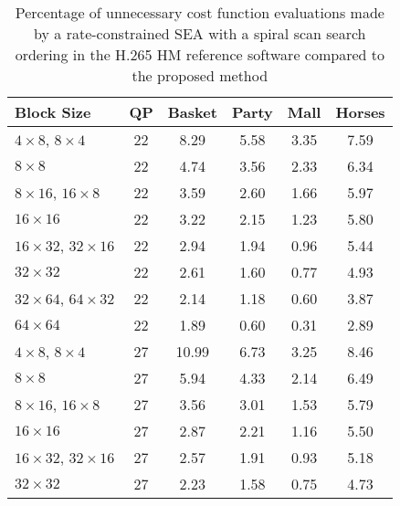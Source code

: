 \documentclass{article}
\begin{document}
\begin{table}[htb]                              
\centering
\small
  \caption{\small Percentage of unnecessary cost function evaluations made by a rate-constrained SEA with a spiral scan search ordering in the H.265 HM reference software compared to the proposed method}                      
\label{tab:SADGain}                       
\begin{tabular}{|l|c|c|c|c|c|}                 
\hline   
Block Size & QP & Basket & Party & Mall & Horses\\  
\hline                               
$4\times 8$, $8\times 4$ & 22 & 8.29 & 5.58 & 3.35 & 7.59 \\    
\hline                                         
$8\times 8$ & 22 & 4.74 & 3.56 & 2.33 & 6.34 \\        
\hline                                         
$8\times 16$, $16\times 8$ & 22 & 3.59 & 2.60 & 1.66 & 5.97 \\  
\hline                                         
$16\times 16$ & 22 & 3.22 & 2.15 & 1.23 & 5.80 \\      
\hline                                         
$16\times 32$, $32\times 16$ & 22 & 2.94 & 1.94 & 0.96 & 5.44 \\
\hline                                         
$32\times 32$ & 22 & 2.61 & 1.60 & 0.77 & 4.93 \\      
\hline                                         
$32\times 64$, $64\times 32$ & 22 & 2.14 & 1.18 & 0.60 & 3.87 \\
\hline                                         
$64\times 64$ & 22 & 1.89 & 0.60 & 0.31 & 2.89 \\      
\hline \hline                                         
$4\times 8$, $8\times 4$ & 27 & 10.99 & 6.73 & 3.25 & 8.46 \\   
\hline                                         
$8\times 8$ & 27 & 5.94 & 4.33 & 2.14 & 6.49 \\        
\hline                                         
$8\times 16$, $16\times 8$ & 27 & 3.56 & 3.01 & 1.53 & 5.79 \\  
\hline                                         
$16\times 16$ & 27 & 2.87 & 2.21 & 1.16 & 5.50 \\      
\hline                                         
$16\times 32$, $32\times 16$ & 27 & 2.57 & 1.91 & 0.93 & 5.18 \\
\hline                                         
$32\times 32$ & 27 & 2.23 & 1.58 & 0.75 & 4.73 \\      

\end{tabular}
\end{table}
\end{document}
